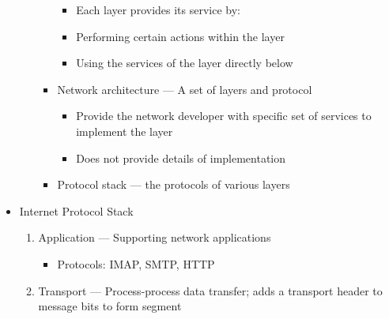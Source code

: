 \begin{itemize}
\begin{itemize}
\begin{itemize}
            \begin{itemize}

              \item Each layer provides its service by:

              \item Performing certain actions within the layer

              \item Using the services of the layer directly below

            \end{itemize}

          \item Network architecture — A set of layers and protocol

            \begin{itemize}

              \item Provide the network developer with specific set of services to implement the layer

              \item Does not provide details of implementation

            \end{itemize}

          \item Protocol stack — the protocols of various layers

        \end{itemize}

    \end{itemize}

  \item Internet Protocol Stack

    \begin{enumerate}

      \item Application — Supporting network applications

        \begin{itemize}

          \item Protocols: IMAP, SMTP, HTTP

        \end{itemize}

      \item Transport — Process-process data transfer; adds a transport header to message bits to form segment

        \begin{itemize}


\end{itemize}
\end{enumerate}
\end{itemize}
